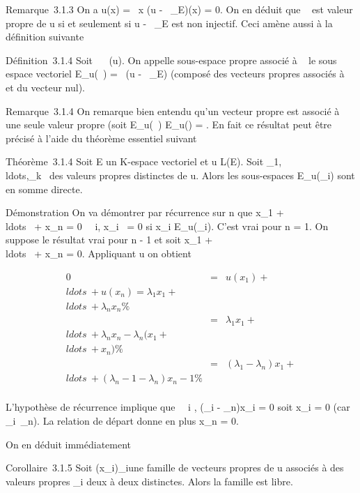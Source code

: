 \documentclass[]{article}
\begin{document}
Remarque~3.1.3 On a u(x) = \lambda~x \Leftrightarrow (u -
\lambda~\mathrmId_E)(x) = 0. On en déduit que \lambda~ est
valeur propre de u si et seulement si u -
\lambda~\mathrmId_E est non injectif. Ceci amène
aussi à la définition suivante

Définition~3.1.4 Soit \lambda~
\in{}~(u). On appelle
sous-espace propre associé à \lambda~ le sous espace vectoriel E_u(\lambda~)
= \mathrmKer~(u -
\lambda~\mathrmId_E) (composé des vecteurs propres
associés à \lambda~ et du vecteur nul).

Remarque~3.1.4 On remarque bien entendu qu'un vecteur propre est associé
à une seule valeur propre (soit E_u(\lambda~) \bigcap E_u(\mu) =
\0\). En fait ce résultat peut être
précisé à l'aide du théorème essentiel suivant

Théorème~3.1.4 Soit E un K-espace vectoriel et u \in L(E). Soit
\lambda_1,\\ldots,\lambda_k~
des valeurs propres distinctes de u. Alors les sous-espaces
E_u(\lambda_i) sont en somme directe.

Démonstration On va démontrer par récurrence sur n que x_1 +
\\ldots~ +
x_n = 0 \rigtharrow~\forall~i, x_i~ = 0 si
x_i \in E_u(\lambda_i). C'est vrai pour n = 1. On
suppose le résultat vrai pour n - 1 et soit x_1 +
\\ldots~ +
x_n = 0. Appliquant u on obtient

\begin{align*} 0& =& u(x_1) +
\\ldots~ +
u(x_n) = \lambda_1x_1 +
\\ldots~ +
\lambda_nx_n\%& \\ & =&
\lambda_1x_1 +
\\ldots~ +
\lambda_nx_n - \lambda_n(x_1 +
\\ldots~ +
x_n) \%& \\ & =& (\lambda_1
- \lambda_n)x_1 +
\\ldots~ +
(\lambda_n-1 - \lambda_n)x_n-1 \%&
\\ \end{align*}

L'hypothèse de récurrence implique que \forall~~i \in
[1,n - 1], (\lambda_i - \lambda_n)x_i = 0 soit
x_i = 0 (car
\lambda_i\neq~\lambda_n). La relation de
départ donne en plus x_n = 0.

On en déduit immédiatement

Corollaire~3.1.5 Soit (x_i)_i\inI une famille de
vecteurs propres de u associés à des valeurs propres \lambda_i deux à
deux distinctes. Alors la famille est libre.
\end{document}

